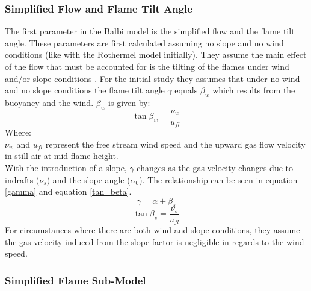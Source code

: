 \documentclass{article}
\begin{document}
\subsubsection{Simplified Flow and Flame Tilt Angle}
\indent The first parameter in the Balbi model is the simplified flow and the flame tilt angle. These parameters are first calculated assuming no slope and no wind conditions (like with the Rothermel model initially). They assume the main effect of the flow that must be accounted for is the tilting of the flames under wind and/or slope conditions \citep{Balbi2007}. For the initial study they assumes that under no wind and no slope conditions the flame tilt angle $\gamma$ equals $\beta _ w$ which results from the buoyancy and the wind. $\beta _w$ is given by:
\begin{equation}
	\label{beta_w}
	\tan \beta _ w = \frac {\nu _ w} {u_{fl}}
\end{equation}
Where:\\
 $\nu _ w$ and $u_{fl}$ represent the free stream wind speed and the upward gas flow velocity in still air at mid flame height. \\
\indent With the introduction of a slope, $\gamma$ changes as the gas velocity changes due to indrafts ($\nu _ s$) and the slope angle ($\alpha _0$). The relationship can be seen in equation \ref{gamma} and equation \ref{tan_beta}. 
\begin{equation}
	\label{gamma}
	\gamma = \alpha + \beta _ s
\end{equation}
\begin{equation}
	\label{tan_beta}
	\tan \beta _ s = \frac {\nu _ s} {u_{fl}}
\end{equation}
\indent For circumstances where there are both wind and slope conditions, they assume the gas velocity induced from the slope factor is negligible in regards to the wind speed.
\subsubsection{Simplified Flame Sub-Model}
\end{document}
